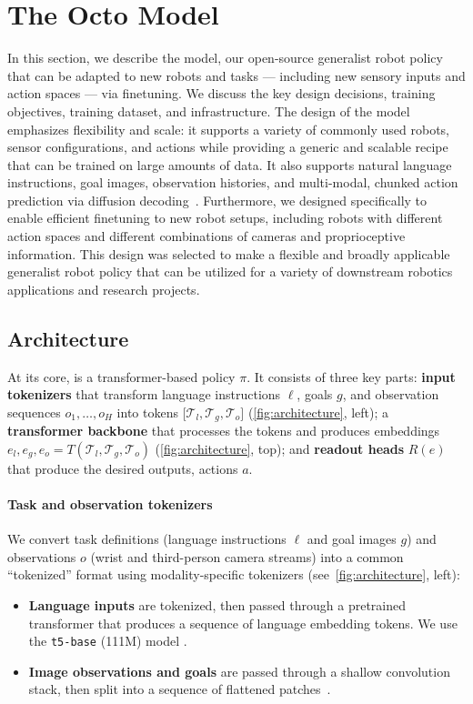 \section{The Octo Model}
\label{sec:approach}
In this section, we describe the \method{} model, our open-source generalist robot policy that can be adapted to new robots and tasks --- including new sensory inputs and action spaces --- via finetuning. We discuss the key design decisions, training objectives, training dataset, and infrastructure.
The design of the \method{} model emphasizes flexibility and scale: it supports a variety of commonly used robots, sensor configurations, and actions while providing a generic and scalable recipe that can be trained on large amounts of data.
It also supports natural language instructions, goal images, observation histories, and multi-modal, chunked action prediction via diffusion decoding~\citep{chi2023diffusionpolicy}. Furthermore, we designed \method{} specifically to enable efficient finetuning to new robot setups, including robots with different action spaces and different combinations of cameras and proprioceptive information. This design was selected to make \method{} a flexible and broadly applicable generalist robot policy that can be utilized for a variety of downstream robotics applications and research projects.


\subsection{Architecture}
\label{sec:arch}

At its core, \method{} is a transformer-based policy $\pi$. It consists of three key parts: \textbf{input tokenizers} that transform language instructions $\ell$, goals $g$, and observation sequences $o_1, \dots, o_H$ into tokens $\big[\mathcal{T}_l, \mathcal{T}_g, \mathcal{T}_o\big]$ (\cref{fig:architecture}, left); a \textbf{transformer backbone} that processes the tokens and produces embeddings $e_l, e_g, e_o = T(\mathcal{T}_l, \mathcal{T}_g, \mathcal{T}_o)$ (\cref{fig:architecture}, top); and \textbf{readout heads} $R(e)$ that produce the desired outputs, \ie actions $a$.

\paragraph{Task and observation tokenizers} We convert task definitions (\eg language instructions $\ell$ and goal images $g$) and observations $o$ (\eg wrist and third-person camera streams) into a common ``tokenized'' format using modality-specific tokenizers (see~\cref{fig:architecture}, left): 
\begin{itemize}
    \item \textbf{Language inputs} are tokenized, then passed through a pretrained transformer that produces a sequence of language embedding tokens. We use the \texttt{t5-base} (111M) model \citep{2020t5}.
    \item \textbf{Image observations and goals} are passed through a shallow convolution stack, then split into a sequence of flattened patches~\citep{dosovitskiy2020image}.
\end{itemize}

